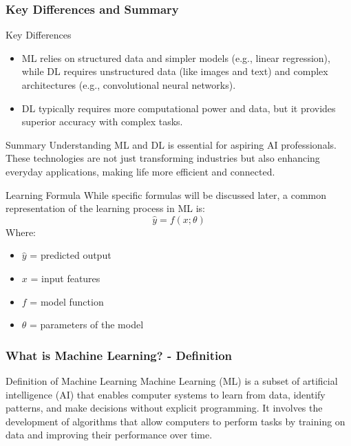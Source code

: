 \documentclass[aspectratio=169]{beamer}
\begin{document}
\begin{frame}[fragile]
    \frametitle{Key Differences and Summary}
    \begin{block}{Key Differences}
        \begin{itemize}
            \item ML relies on structured data and simpler models (e.g., linear regression), while DL requires 
            unstructured data (like images and text) and complex architectures (e.g., convolutional neural networks).
            \item DL typically requires more computational power and data, but it provides superior accuracy with complex tasks.
        \end{itemize}
    \end{block}

    \begin{block}{Summary}
        Understanding ML and DL is essential for aspiring AI professionals. These technologies are not just 
        transforming industries but also enhancing everyday applications, making life more efficient and connected.
    \end{block}
    
    \begin{block}{Learning Formula}
        While specific formulas will be discussed later, a common representation of the learning process in ML is:
        \begin{equation}
            \hat{y} = f(x; \theta)
        \end{equation}
        Where:
        \begin{itemize}
            \item \( \hat{y} \) = predicted output
            \item \( x \) = input features
            \item \( f \) = model function
            \item \( \theta \) = parameters of the model
        \end{itemize}
    \end{block}
\end{frame}

\begin{frame}[fragile]
    \frametitle{What is Machine Learning? - Definition}
    \begin{block}{Definition of Machine Learning}
        Machine Learning (ML) is a subset of artificial intelligence (AI) that enables computer systems to learn from data, identify patterns, and make decisions without explicit programming. 
        It involves the development of algorithms that allow computers to perform tasks by training on data and improving their performance over time.
    \end{block}
\end{frame}
\end{document}
